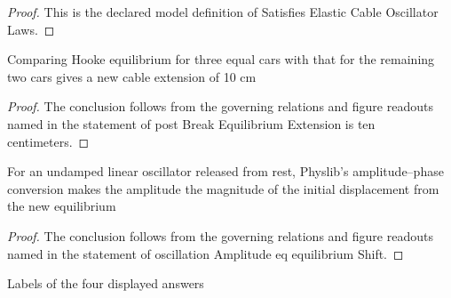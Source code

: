 \begin{proof}
  This is the declared model definition of Satisfies Elastic Cable Oscillator Laws.
\end{proof}
\begin{lemma}
  \label{lem:physics:phyx-mini-0271:phyxminiproblems-problemphyxmini0271-postbreakequilibriumextension-is-ten-centimeters}
  Comparing Hooke equilibrium for three equal cars with that for the remaining two cars gives a new cable extension of 10 cm
\end{lemma}
\begin{proof}
  The conclusion follows from the governing relations and figure readouts named in the statement of post Break Equilibrium Extension is ten centimeters.
\end{proof}
\begin{lemma}
  \label{lem:physics:phyx-mini-0271:phyxminiproblems-problemphyxmini0271-oscillationamplitude-eq-equilibriumshift}
  For an undamped linear oscillator released from rest, Physlib's amplitude--phase conversion makes the amplitude the magnitude of the initial displacement from the new equilibrium
\end{lemma}
\begin{proof}
  The conclusion follows from the governing relations and figure readouts named in the statement of oscillation Amplitude eq equilibrium Shift.
\end{proof}
\begin{definition}
  \label{def:physics:phyx-mini-0271:phyxminiproblems-problemphyxmini0271-answerchoice}
  Labels of the four displayed answers
\end{definition}

